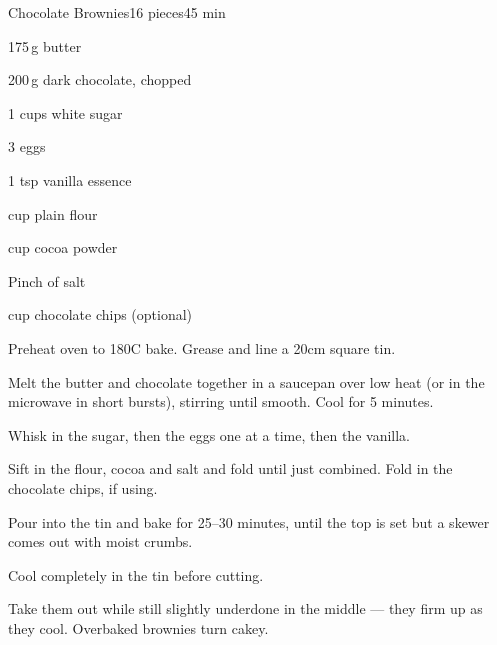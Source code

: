 \begin{recipebox}{Chocolate Brownies}{16 pieces}{45 min}
\begin{ingredients}
  \item 175\,g butter
  \item 200\,g dark chocolate, chopped
  \item 1 cups white sugar
  \item 3 eggs
  \item 1 tsp vanilla essence
  \item {} cup plain flour
  \item {} cup cocoa powder
  \item Pinch of salt
  \item {} cup chocolate chips (optional)
\end{ingredients}

\begin{method}
  \item Preheat oven to 180\degree C bake. Grease and line a 20cm square tin.
  \item Melt the butter and chocolate together in a saucepan over low heat (or in the microwave in short bursts), stirring until smooth. Cool for 5 minutes.
  \item Whisk in the sugar, then the eggs one at a time, then the vanilla.
  \item Sift in the flour, cocoa and salt and fold until just combined. Fold in the chocolate chips, if using.
  \item Pour into the tin and bake for 25--30 minutes, until the top is set but a skewer comes out with moist crumbs.
  \item Cool completely in the tin before cutting.
\end{method}

\begin{notes}
Take them out while still slightly underdone in the middle --- they firm up as they cool. Overbaked brownies turn cakey.
\end{notes}
\end{recipebox}
